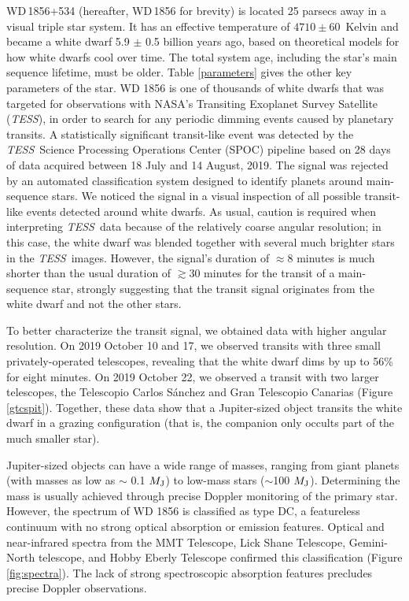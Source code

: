 \documentclass{nature3}
\newcommand*{\bedittwo}{\textcolor{new_black}}
\newcommand{\mjup}{\ensuremath{M_{\rm J}}}
\newcommand{\project}[1]{\textsl{#1}}
\newcommand{\TESS}{\project{TESS}}
\begin{document}
WD\,1856+534 (hereafter, WD\,1856 for brevity) is located 25 parsecs away in a visual triple star system. It has an effective temperature of $4710\pm 60$~Kelvin and became a white dwarf 5.9 $\pm$ 0.5  billion years ago, based on theoretical models for how white dwarfs cool over time. The total system age, including the star's main sequence lifetime, must be older. Table \ref{parameters} gives the other key parameters of the star. WD 1856 is one of thousands of white dwarfs that was targeted for observations with NASA's Transiting Exoplanet Survey Satellite (\TESS), in order to search for any periodic dimming events caused by planetary transits. A statistically significant transit-like event was detected by the \TESS\ Science Processing Operations Center (SPOC) pipeline based on 28 days of data acquired between 18 July and 14 August, 2019. The signal was rejected by an automated classification system designed to identify planets around main-sequence stars. We noticed the signal in a visual inspection of all possible transit-like events detected around white dwarfs.
As usual, caution is required when interpreting \TESS\ data because of the relatively coarse angular resolution; in this case, the white dwarf was blended together with several much brighter stars in the \TESS\ images.
However, the signal's duration of $\approx$8 minutes is much shorter than the usual duration of $\gtrsim$30 minutes for the transit of a main-sequence star, strongly suggesting that the transit signal originates from the white dwarf and not the other stars. 

To better characterize the transit signal, we obtained data with higher angular resolution. On 2019 October 10 and 17, we observed transits with three small privately-operated telescopes, revealing that the white dwarf dims by up to 56\% for eight minutes.  On 2019 October 22, we observed a transit with two larger telescopes, the Telescopio Carlos S\'anchez and Gran Telescopio Canarias (Figure \ref{gtcspit}). Together, these data show that a Jupiter-sized object transits the white dwarf in a grazing configuration (that is, the companion only occults part of the much smaller star). 

Jupiter-sized objects can have a wide range of masses, ranging from giant planets (with masses as low as $\sim$ 0.1 \mjup) to low-mass stars ($\sim$100 \mjup). Determining the mass is usually achieved through precise Doppler monitoring of the primary star. However, the spectrum of WD 1856 is classified as type DC\cite{mccooksion}, a featureless continuum with no strong optical absorption or emission features. Optical and near-infrared spectra from the MMT Telescope, Lick Shane Telescope, Gemini-North telescope, and Hobby Eberly Telescope confirmed this classification \bedittwo{(Figure \ref{fig:spectra})}. The lack of strong spectroscopic absorption features precludes precise Doppler observations.
\end{document}
